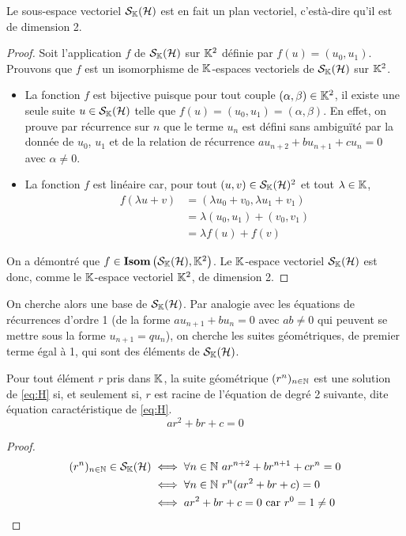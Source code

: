 \begin{prop}
  Le sous-espace vectoriel \(\mathcal{S}_{\mathbb{K}}(\mathcal{H})\) est en fait un plan vectoriel, c'està-dire qu'il est de dimension 2.
\end{prop}
\begin{proof}
  Soit l'application \(f\) de \(\mathcal{S}_{\mathbb{K}}(\mathcal{H})\) sur \(\mathbb{K}^2\) définie par \(f(u)=(u_0,u_1)\). Prouvons que \(f\) est un isomorphisme de \(\mathbb{K}\)-espaces vectoriels de \(\mathcal{S}_{\mathbb{K}}(\mathcal{H})\) sur \(\mathbb{K}^2\).
  \begin{itemize}
  \item La fonction \(f\) est bijective puisque pour tout couple \((\alpha, \beta) \in \mathbb{K}^2\), il existe une seule suite \(u \in \mathcal{S}_{\mathbb{K}}(\mathcal{H})\) telle que \(f(u)=(u_0,u_1)=(\alpha,\beta)\). En effet, on prouve par récurrence sur \(n\) que le terme \(u_n\) est défini sans ambiguïté par la donnée de \(u_0\), \(u_1\) et de la relation de récurrence \(au_{n+2}+bu_{n+1}+cu_n=0\) avec \(\alpha \neq 0\).
  \item La fonction \(f\) est linéaire car, pour tout \((u,v) \in \mathcal{S}_{\mathbb{K}}(\mathcal{H})^2\) et tout \(\lambda \in \mathbb{K}\),
    \begin{align}
      f(\lambda u+v) &=(\lambda u_0 +v_0, \lambda u_1+v_1) \\
      &=\lambda (u_0,u_1) +(v_0,v_1)\\
      &=\lambda f(u)+f(v)
    \end{align}
  \end{itemize}
On a démontré que \(f \in \mathbf{Isom}\left(\mathcal{S}_{\mathbb{K}}(\mathcal{H}),\mathbb{K}^2\right)\). Le \(\mathbb{K}\)-espace vectoriel \(\mathcal{S}_{\mathbb{K}}(\mathcal{H})\) est donc, comme le \(\mathbb{K}\)-espace vectoriel \(\mathbb{K}^2\), de dimension 2.
\end{proof}

On cherche alors une base de \(\mathcal{S}_{\mathbb{K}}(\mathcal{H})\). Par analogie avec les équations de récurrences d'ordre 1 (de la forme \(au_{n+1}+bu_n =0\) avec \(ab \neq 0\) qui peuvent se mettre sous la forme \(u_{n+1}=qu_n\)), on cherche les suites géométriques, de premier terme égal à 1, qui sont des éléments de \(\mathcal{S}_{\mathbb{K}}(\mathcal{H})\).

\begin{prop}
  Pour tout élément \(r\) pris dans \(\mathbb{K}\), la suite géométrique \((r^n)_{n \in \mathbb{N}}\) est une solution de \eqref{eq:H} si, et seulement si, \(r\) est racine de l'équation de degré 2 suivante, dite équation caractéristique de \eqref{eq:H}.
  \begin{equation}
    ar^2+br+c=0 \label{eq:EC} \tag{E.C.}
  \end{equation}
\end{prop}
\begin{proof}
  \begin{align}
    (r^n)_{n \in  \N} \in \S_\K(\H) &\iff \forall n \in \N \ ar^{n+2} +br^{n+1}+cr^n = 0 \\
    &\iff \forall n \in \N \ r^n(ar^2+br+c)=0\\
    &\iff ar^2+br+c=0 \text{~car } r^0=1 \neq 0
  \end{align}
\end{proof}

